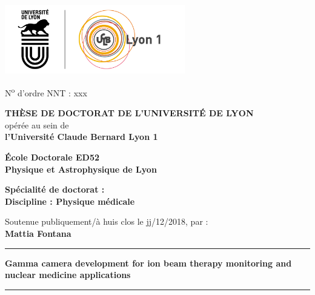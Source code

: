 \documentclass[11pt,a4paper]{book}
\begin{document}
\setlength{\parindent}{0pt}
\thispagestyle{empty}


\begin{center}
\includegraphics[height=3cm]{logo} %
\end{center}


\fontsize{11pt}{13pt}\selectfont
N\textsuperscript{o} d'ordre NNT : xxx

\vspace{1cm}

\begin{center}
\fontsize{14pt}{16pt}\selectfont
\textbf{\uppercase{Thèse de doctorat de l'université de Lyon}}\\
\fontsize{12pt}{14pt}\selectfont
opérée au sein de\\
\textbf{l'Université Claude Bernard Lyon 1}

\vspace{0.5cm}

\textbf{École Doctorale ED52\\%
Physique et Astrophysique de Lyon}%

\vspace{0.5cm}

\textbf{Spécialité de doctorat :\\
Discipline : Physique m\'{e}dicale} %


\vspace{1.5cm}

Soutenue publiquement/à huis clos le jj/12/2018, par :\\
\fontsize{14pt}{16pt}\selectfont
\textbf{Mattia Fontana}

\vspace{1.5cm} %

\rule[20pt]{\textwidth}{0.5pt}

\fontsize{25pt}{28pt}\selectfont
\textbf{Gamma camera development for ion beam therapy monitoring and nuclear medicine applications}

\rule{\textwidth}{0.5pt}

\vspace{2cm} %
\end{center}
\end{document}
